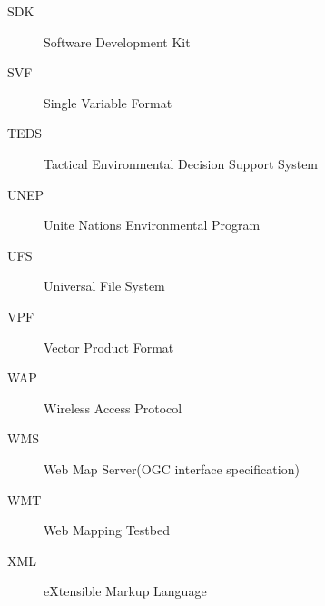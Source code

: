 \begin{description}
\item[SDK]              Software Development Kit
\item[SVF]              Single Variable Format
\item[TEDS]             Tactical Environmental Decision Support System
\item[UNEP]             Unite Nations Environmental Program
\item[UFS]              Universal File System
\item[VPF]              Vector Product Format
\item[WAP]              Wireless Access Protocol
\item[WMS]              Web Map Server(OGC interface specification)
\item[WMT]              Web Mapping Testbed
\item[XML]              eXtensible Markup Language
\end{description}



